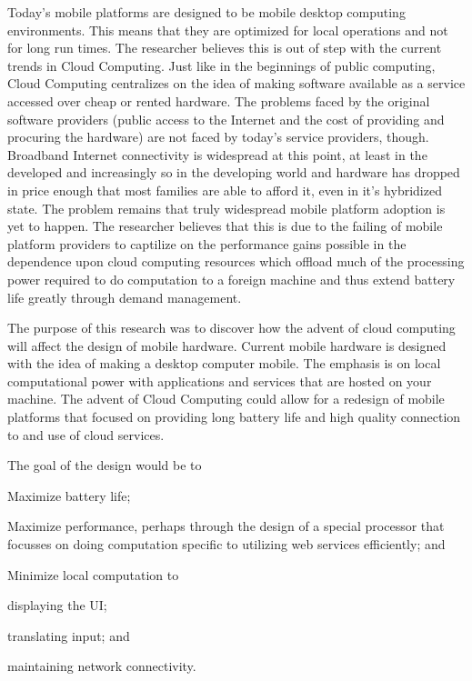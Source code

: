 \documentclass[12pt,oneside,letterpaper,titlepage]{report}
\begin{document}
Today's mobile platforms are designed to be mobile desktop computing
environments.  This means that they are optimized for local operations and not
for long run times.  The researcher believes this is out of step with the
current trends in Cloud Computing.  Just like in the beginnings of public
computing, Cloud Computing centralizes on the idea of making software available
as a service accessed over cheap or rented hardware.  The problems faced by the
original software providers (public access to the Internet and the cost of
providing and procuring the hardware) are not faced by today's service
providers, though.  Broadband Internet connectivity is widespread at this point,
at least in the developed and increasingly so in the developing world and
hardware has dropped in price enough that most families are able to afford it,
even in it's hybridized state.  The problem remains that truly widespread mobile
platform adoption is yet to happen.  The researcher believes that this is due to
the failing of mobile platform providers to captilize on the performance gains
possible in the dependence upon cloud computing resources which offload much of
the processing power required to do computation to a foreign machine and thus
extend battery life greatly through demand management.

The purpose of this research was to discover how the advent of cloud computing
will affect the design of mobile hardware.  Current mobile hardware is designed
with the idea of making a desktop computer mobile.  The emphasis is on local
computational power with applications and services that are hosted on your
machine.  The advent of Cloud Computing could allow for a redesign of mobile
platforms that focused on providing long battery life and high quality
connection to and use of cloud services.

The goal of the design would be to 
\begin{inparaenum}[(1)]
\item Maximize battery life;
\item Maximize performance, perhaps through the design of a special processor
  that focusses on doing computation specific to utilizing web services
  efficiently; and
\item Minimize local computation to 
  \begin{inparaenum}[(a)]
  \item displaying the UI;
  \item translating input; and
  \item maintaining network connectivity.
  \end{inparaenum}
\end{inparaenum}
\end{document}
